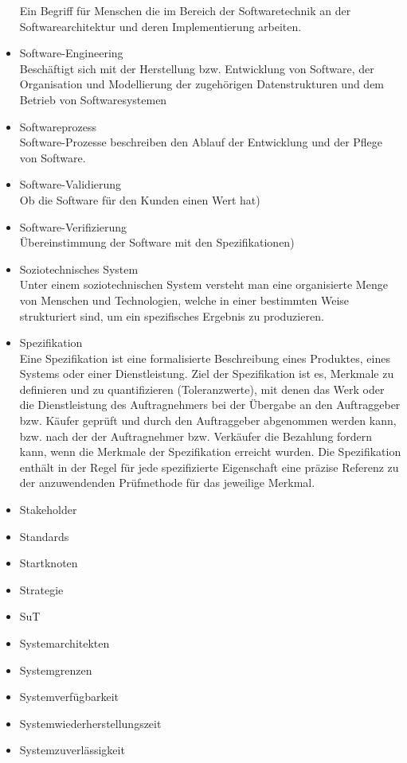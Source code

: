 \begin{itemize}
Ein Begriff für Menschen die im Bereich der Softwaretechnik an der Softwarearchitektur und deren Implementierung arbeiten.
\item 	Software-Engineering\\
Beschäftigt sich mit der Herstellung bzw. Entwicklung von Software, der Organisation und Modellierung der zugehörigen Datenstrukturen und dem Betrieb von Softwaresystemen
\item 	Softwareprozess\\Software-Prozesse beschreiben den Ablauf der Entwicklung und der Pflege von Software.
\item 	Software-Validierung \\  Ob die Software für den Kunden einen Wert hat)
\item 	Software-Verifizierung \\ Übereinstimmung der Software mit den Spezifikationen)
\item 	Soziotechnisches System\\Unter einem soziotechnischen System versteht man eine organisierte Menge von Menschen und Technologien, welche in einer bestimmten Weise strukturiert sind, um ein spezifisches Ergebnis zu produzieren.
\item 	Spezifikation\\Eine Spezifikation  ist eine formalisierte Beschreibung eines Produktes, eines Systems oder einer Dienstleistung. Ziel der Spezifikation ist es, Merkmale zu definieren und zu quantifizieren (Toleranzwerte), mit denen das Werk oder die Dienstleistung des Auftragnehmers bei der Übergabe an den Auftraggeber bzw. Käufer geprüft und durch den Auftraggeber abgenommen werden kann, bzw. nach der der Auftragnehmer bzw. Verkäufer die Bezahlung fordern kann, wenn die Merkmale der Spezifikation erreicht wurden. Die Spezifikation enthält in der Regel für jede spezifizierte Eigenschaft eine präzise Referenz zu der anzuwendenden Prüfmethode für das jeweilige Merkmal.
\item 	Stakeholder
\item 	Standards
\item 	Startknoten
\item 	Strategie
\item 	SuT
\item 	Systemarchitekten
\item 	Systemgrenzen
\item 	Systemverfügbarkeit
\item 	Systemwiederherstellungszeit
\item 	Systemzuverlässigkeit

\end{itemize}

